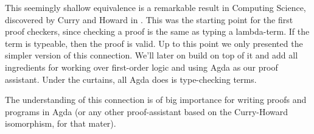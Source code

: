 This seemingly shallow equivalence is a remarkable result in Computing Science, discovered
by Curry and Howard in \cite{Curry01,Howard01}. This was the starting point for the
first proof checkers, since checking a proof is the same as typing a lambda-term. If the
term is typeable, then the proof is valid. Up to this point we only presented the simpler
version of this connection. We'll later on build on top of it and add all ingredients
for working over first-order logic and using Agda as our proof assistant. Under the curtains,
all Agda does is type-checking terms.

The understanding of this connection is of big importance for writing proofs and programs in
Agda (or any other proof-assistant based on the Curry-Howard isomorphism, for that mater).


